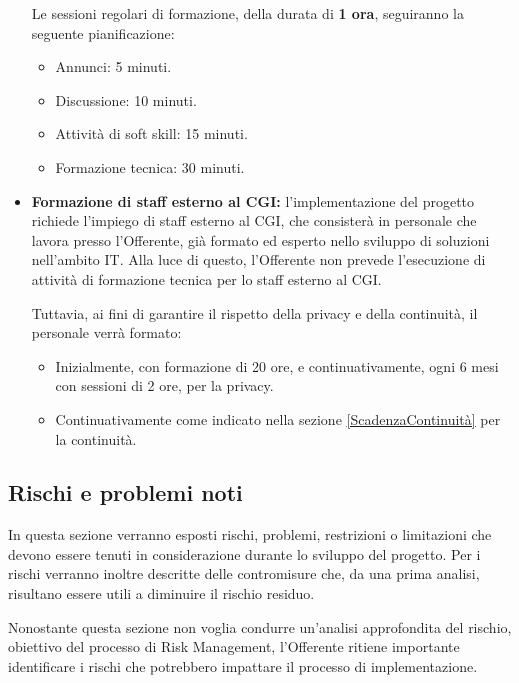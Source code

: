 \begin{itemize}
                        Le sessioni regolari di formazione, della durata di \textbf{1 ora}, seguiranno la seguente pianificazione:
                        \begin{itemize}
                        	\item Annunci: 5 minuti.
                            \item Discussione: 10 minuti.
                            \item Attività di soft skill: 15 minuti.
                            \item Formazione tecnica: 30 minuti.
                        \end{itemize}
                        
                        \item \textbf{Formazione di staff esterno al CGI:} l'implementazione del progetto richiede l'impiego di staff esterno al CGI, che consisterà in personale che lavora presso l'Offerente, già formato ed esperto nello sviluppo di soluzioni nell'ambito IT. Alla luce di questo, l'Offerente non prevede l'esecuzione di attività di formazione tecnica per lo staff esterno al CGI.


Tuttavia, ai fini di garantire il rispetto della privacy e della continuità, il personale verrà formato:
\begin{itemize}
	\item Inizialmente, con formazione di 20 ore, e continuativamente, ogni 6 mesi con sessioni di 2 ore, per la privacy.
    \item Continuativamente come indicato nella sezione \ref{ScadenzaContinuità} per la continuità.
\end{itemize}
\end{itemize}
                    
			\subsection{Rischi e problemi noti}
            	In questa sezione verranno esposti rischi, problemi, restrizioni o limitazioni che devono essere tenuti in considerazione durante lo sviluppo del progetto. Per i rischi verranno inoltre descritte delle contromisure che, da una prima analisi, risultano essere utili a diminuire il rischio residuo. 
                
                
                Nonostante questa sezione non voglia condurre un'analisi approfondita del rischio, obiettivo del processo di Risk Management, l'Offerente ritiene importante identificare i rischi che potrebbero impattare il processo di implementazione.
                
